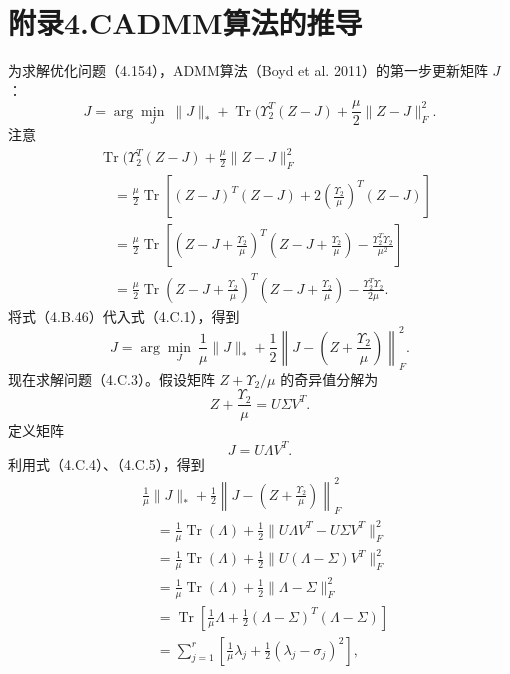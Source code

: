 \section*{附录4.C\quad ADMM算法的推导}

为求解优化问题（4.154），ADMM算法（Boyd et al. 2011）的第一步更新矩阵 $J$：
\begin{equation}
J=\arg\min_J\ \|J\|_*+\operatorname{Tr}(\Upsilon_2^T(Z-J)
+\frac\mu2\|Z-J\|_F^2.\tag{4.C.1}
\end{equation}
注意
\begin{equation}
\begin{aligned}
&\operatorname{Tr}(\Upsilon_2^T(Z-J)+\frac\mu2\|Z-J\|_F^2\\
&\quad=\frac\mu2\operatorname{Tr}\left[
 (Z-J)^T(Z-J)+2\left(\frac{\Upsilon_2}{\mu}\right)^T(Z-J)\right]\\
&\quad=\frac\mu2\operatorname{Tr}\left[
 \left(Z-J+\frac{\Upsilon_2}{\mu}\right)^T
 \left(Z-J+\frac{\Upsilon_2}{\mu}\right)-\frac{\Upsilon_2^T\Upsilon_2}{\mu^2}\right]\\
&\quad=\frac\mu2\operatorname{Tr}
 \left(Z-J+\frac{\Upsilon_2}{\mu}\right)^T
 \left(Z-J+\frac{\Upsilon_2}{\mu}\right)-\frac{\Upsilon_2^T\Upsilon_2}{2\mu}.
\end{aligned}\tag{4.C.2}
\end{equation}
将式（4.B.46）代入式（4.C.1），得到
\begin{equation}
J=\arg\min_J\ \frac1\mu\|J\|_*
+\frac12\left\|J-\left(Z+\frac{\Upsilon_2}{\mu}\right)\right\|_F^2.\tag{4.C.3}
\end{equation}
现在求解问题（4.C.3）。假设矩阵 $Z+\Upsilon_2/\mu$ 的奇异值分解为
\begin{equation}
Z+\frac{\Upsilon_2}{\mu}=U\Sigma V^T.\tag{4.C.4}
\end{equation}
定义矩阵
\begin{equation}
J=U\Lambda V^T.\tag{4.C.5}
\end{equation}
利用式（4.C.4）、（4.C.5），得到
\begin{equation}
\begin{aligned}
&\frac1\mu\|J\|_*+\frac12\left\|J-\left(Z+\frac{\Upsilon_2}{\mu}\right)\right\|_F^2\\
&\quad=\frac1\mu\operatorname{Tr}(\Lambda)+\frac12\|U\Lambda V^T-U\Sigma V^T\|_F^2\\
&\quad=\frac1\mu\operatorname{Tr}(\Lambda)+\frac12\|U(\Lambda-\Sigma)V^T\|_F^2\\
&\quad=\frac1\mu\operatorname{Tr}(\Lambda)+\frac12\|\Lambda-\Sigma\|_F^2\\
&\quad=\operatorname{Tr}\left[\frac1\mu\Lambda+
 \frac12(\Lambda-\Sigma)^T(\Lambda-\Sigma)\right]\\
&\quad=\sum_{j=1}^{r}\left[\frac1\mu\lambda_j+
 \frac12(\lambda_j-\sigma_j)^2\right],
\end{aligned}\tag{4.C.6}
\end{equation}
